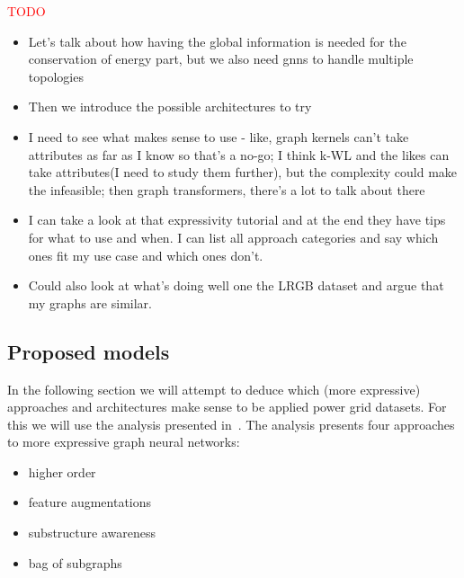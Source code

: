 \textcolor{red}{TODO}


\begin{itemize}
    \item Let's talk about how having the global information is needed for the conservation of energy
    part, but we also need gnns to handle multiple topologies
    \item Then we introduce the possible architectures to try
    \item I need to see what makes sense to use - like, graph kernels can't take attributes as far as I
    know so that's a no-go; I think k-WL and the likes can take attributes(I need to study them further),
    but the complexity could make the infeasible; then graph transformers, there's a lot to talk about there
    \item I can take a look at that expressivity tutorial and at the end they have tips for what to use and when.
    I can list all approach categories and say which ones fit my use case and which ones don't.
    \item Could also look at what's doing well one the LRGB dataset and argue that my graphs are similar.
\end{itemize}

\subsection*{Proposed models}
In the following section we will attempt to deduce which (more expressive) approaches and architectures
make sense to be applied power grid datasets.
For this we will use the analysis presented in~\cite{expresive2022tutorial}.
The analysis presents four approaches to more expressive graph neural networks:
\begin{itemize}
    \item higher order
    \item feature augmentations
    \item substructure awareness
    \item bag of subgraphs
\end{itemize}

